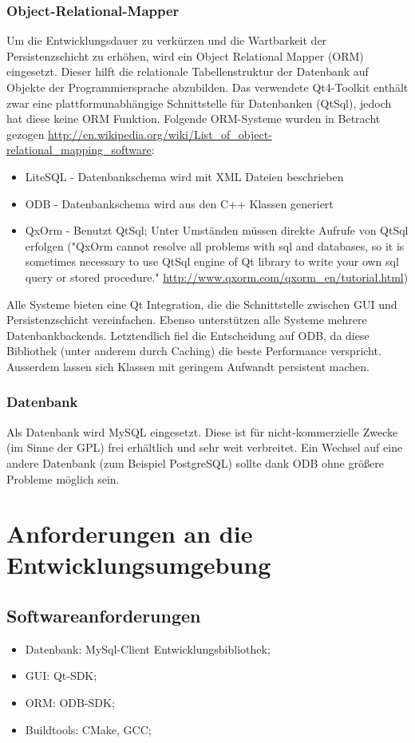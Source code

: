\documentclass[a4paper,10pt]{article}
\begin{document}
\subsubsection{Object-Relational-Mapper}
Um die Entwicklungsdauer zu verkürzen und die Wartbarkeit der Persistenzschicht zu erhöhen, wird ein Object Relational Mapper (ORM) eingesetzt. 
Dieser hilft die relationale Tabellenstruktur der Datenbank auf Objekte der Programmiersprache abzubilden.
Das verwendete Qt4-Toolkit enthält zwar eine plattformunabhängige Schnittstelle für Datenbanken (QtSql), jedoch hat diese keine ORM Funktion.
Folgende ORM-Systeme wurden in Betracht gezogen \newline\url{http://en.wikipedia.org/wiki/List_of_object-relational_mapping_software}:
\begin{itemize}
	\item LiteSQL - Datenbankschema wird mit XML Dateien beschrieben
	\item ODB - Datenbankschema wird aus den C++ Klassen generiert
	\item QxOrm - Benutzt QtSql; Unter Umständen müssen direkte Aufrufe von QtSql erfolgen
	("QxOrm cannot resolve all problems with sql and databases, so it is sometimes necessary to use QtSql engine of Qt library to write your own sql query or stored procedure." \url{http://www.qxorm.com/qxorm_en/tutorial.html})
\end{itemize}
Alle Systeme bieten eine Qt Integration, die die Schnittstelle zwischen GUI und Persistenzschicht vereinfachen.
Ebenso unterstützen alle Systeme mehrere Datenbankbackends.
Letztendlich fiel die Entscheidung auf ODB, da diese Bibliothek (unter anderem durch Caching) die beste Performance verspricht.
Ausserdem lassen sich Klassen mit geringem Aufwandt persistent machen.
\subsubsection{Datenbank}
Als Datenbank wird MySQL eingesetzt. Diese ist für nicht-kommerzielle Zwecke (im Sinne der GPL) frei erhältlich und sehr weit verbreitet. 
Ein Wechsel auf eine andere Datenbank (zum Beispiel PostgreSQL) sollte dank ODB ohne größere Probleme möglich sein.

\section{Anforderungen an die Entwicklungsumgebung}
\subsection{Softwareanforderungen}
\begin{itemize}
	\item Datenbank: MySql-Client Entwicklungsbibliothek;
	\item GUI: Qt-SDK; 
	\item ORM: ODB-SDK;
	\item Buildtools: CMake, GCC;
\end{itemize}
\end{document}

